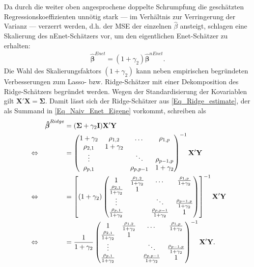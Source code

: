 \documentclass[12pt, a4paper]{report}\usepackage[]{graphicx}\usepackage[]{color}
\begin{document}
Da durch die weiter oben angesprochene doppelte Schrumpfung die geschätzten Regressionskoeffizienten unnötig stark --- im Verhältnis zur Verringerung der Varianz --- verzerrt werden, d.h. der MSE der einzelnen $\hat{\beta}$ ansteigt, schlagen \cite{zou_regularization_2005} eine Skalierung des nEnet-Schätzers vor, um den eigentlichen Enet-Schätzer zu erhalten:
\begin{align}\label{Eq_Enet-Schaetzer}
\boldsymbol{\hat{\beta}}^{Enet}=(1+\gamma_2)\boldsymbol{\hat{\beta}}^{nEnet}.
\end{align}
Die Wahl des Skalierungsfaktors $(1+\gamma_2)$ kann neben  empirischen begründeten Verbesserungen zum Lasso- bzw. Ridge-Schätzer \cite{zou_regularization_2005} mit einer Dekomposition des Ridge-Schätzers begründet werden. Wegen der Standardisierung der Kovariablen gilt $\mathbf{X}'\mathbf{X}=\boldsymbol{\Sigma}$. Damit lässt sich der Ridge-Schätzer aus \eqref{Eq_Ridge_estimate}, der als Summand in \eqref{Eq_Naiv_Enet_Eigene} vorkommt, schreiben als
\begin{align}\label{Eq_Decorr_nEnet}
&& \boldsymbol{\hat{\beta}}^{Ridge}&=(\boldsymbol{\Sigma}+\gamma_2\mathbf{I})\mathbf{X}'\mathbf{Y} \notag \\
&\Leftrightarrow& &=\begin{pmatrix}
1+\gamma_2 & \rho_{1,2}   & \dots & \rho_{1,p} \\
\rho_{2,1} & 1 + \gamma_2 &       &            \\
\vdots     &              & \ddots& \rho_{p-1,p}\\
\rho_{p,1} &              & \rho_{p, p-1}& 1 + \gamma_2
\end{pmatrix}^{-1}\mathbf{X}'\mathbf{Y} \notag \\
&\Leftrightarrow& &=\left[ (1+\gamma_2) \begin{pmatrix}
1 & \frac{\rho_{1,2}}{1+\gamma_2}&\dots&\frac{\rho_{1,p}}{1+\gamma_2} \\
\frac{\rho_{2,1}}{1+\gamma_2} & 1 &       &            \\
\vdots     &              & \ddots& \frac{\rho_{p-1,p}}{1+\gamma_2}\\
\frac{\rho_{p,1}}{1+\gamma_2} &              & \frac{\rho_{p, p-1}}{1+\gamma_2}& 1
\end{pmatrix} \right]^{-1}\mathbf{X}'\mathbf{Y} \notag \\
&\Leftrightarrow& &=\frac{1}{1+\gamma_2} \begin{pmatrix}
1 & \frac{\rho_{1,2}}{1+\gamma_2}&\dots&\frac{\rho_{1,p}}{1+\gamma_2} \\
\frac{\rho_{2,1}}{1+\gamma_2} & 1 &       &            \\
\vdots     &              & \ddots& \frac{\rho_{p-1,p}}{1+\gamma_2}\\
\frac{\rho_{p,1}}{1+\gamma_2} &              & \frac{\rho_{p, p-1}}{1+\gamma_2}& 1
\end{pmatrix}^{-1}\mathbf{X}'\mathbf{Y}.
\end{align}
\end{document}
